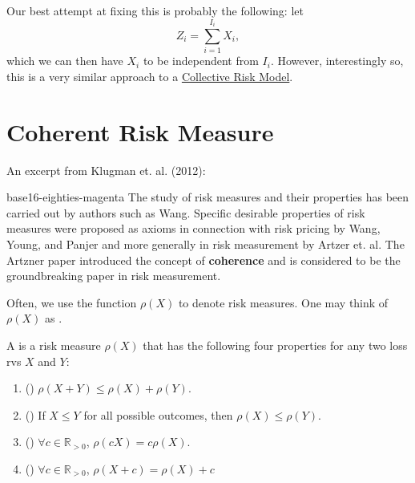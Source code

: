\documentclass[notoc,notitlepage]{tufte-book}
\begin{document}
Our best attempt at fixing this is probably the following: let
\begin{equation*}
  Z_i = \sum_{i=1}^{I_i} X_i,
\end{equation*}
which we can then have $X_i$ to be independent from $I_i$. However, interestingly so, this is a very similar approach to a \hyperref[defn:collective_risk_model]{Collective Risk Model}.


\section{Coherent Risk Measure}%
\label{sec:coherent_risk_measure}

An excerpt from Klugman et. al. (2012)\cite{KlugmanPanjerWillmot2012}:

\begin{quotebox}{base16-eighties-magenta}
  The study of risk measures and their properties has been carried out by authors such as Wang. Specific desirable properties of risk measures were proposed as axioms in connection with risk pricing by Wang, Young, and Panjer and more generally in risk measurement by Artzer et. al. The Artzner paper introduced the concept of \textbf{coherence} and is considered to be the groundbreaking paper in risk measurement.
\end{quotebox}

Often, we use the function $\rho(X)$ to denote risk measures. One may think of $\rho(X)$ as .

\begin{defn}
\label{defn:coherent_risk_measure}
  A  is a risk measure $\rho(X)$ that has the following four properties for any two loss rvs $X$ and $Y$:
  \begin{enumerate}
    \item () $\rho(X + Y) \leq \rho(X) + \rho(Y)$.
    \item () If $X \leq Y$ for all possible outcomes, then $\rho(X) \leq \rho(Y)$.
    \item () $\forall c \in \mathbb{R}_{> 0}$, $\rho(cX) = c\rho(X)$.
    \item () $\forall c \in \mathbb{R}_{> 0}$, $\rho(X + c) = \rho(X) + c$
  \end{enumerate}
\end{defn}
\end{document}
